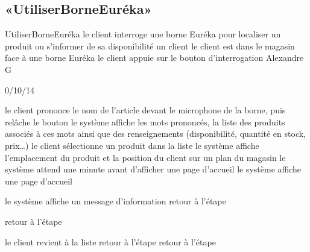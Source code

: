 \subsection{«UtiliserBorneEuréka»}

\startCU
\nom UtiliserBorneEuréka
\but le client interroge une borne Euréka pour localiser un produit ou s’informer de sa disponibilité
\acteur un client
\precondition le client est dans le magasin face à une borne Euréka
\declenchement le client appuie sur le bouton d'interrogation
\auteur Alexandre G
\date 30/10/14

\nominal %
\startnominal
\etape[DEBUT] le client prononce le nom de l'article devant le microphone de la borne, puis relâche le bouton
\etape[INCONNU] le système affiche les mots prononcés, la liste des produits associés à ces mots ainsi que des renseignements (disponibilité, quantité en stock, prix\dots) 
\etape[LISTEVIDE] le client sélectionne un produit dans la liste
\etape le système affiche l'emplacement du produit et la position du client sur un plan du magasin
\etape[AUTRE] le système attend une minute avant d'afficher une page d'accueil
\stopnominal
\postcondition le système affiche une page d'accueil

\alternatifs 

\startalternatif[INCONNU]
  \etape le système affiche un message d'information
  \etape retour à l'étape \in[AUTRE]
\stopcondition
\stopalternatif

\startalternatif[LISTEVIDE]
\etape retour à l'étape \in[AUTRE]
\stopcondition
\stopalternatif

\startalternatif[AUTRE] 
  \etape le client revient à la liste 
  \etape retour à l'étape \in[LISTEVIDE]
\stopcondition
{}
  \etape retour à l'étape \in[DEBUT]
\stopcondition
\stopalternatif

\stopCU
